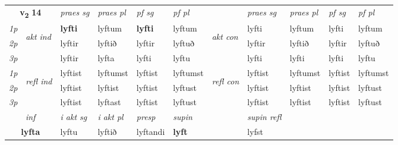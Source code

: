 \noindent
\begin{tabular}{lllllllllll} \toprule
\multicolumn{2}{c}{\textbf{v{\textsubscript{2}}} \Large{\textbf{14}}}  &  \textit{praes sg}  & \textit{praes pl}  &\textit{ pf sg} & \textit{pf pl} &  &  \textit{praes sg}  & \textit{praes pl}  & \textit{pf sg} & \textit{pf pl } \\*
	\cmidrule{3-6} \cmidrule{8-11}
 {\textit{1p}} & \multirow{3}{*}{\begin{turn}{90}\textit{akt ind}\end{turn}} & \textbf{lyfti} & lyftum & \textbf{lyfti} & lyftum & \multirow{3}{*}{\begin{turn}{90}\textit{akt con}\end{turn}} &lyfti & lyftum & lyfti & lyftum\\*
 {\textit{2p}} &  &  lyftir  & lyftið & lyftir & lyftuð & & lyftir & lyftið & lyftir & lyftuð \\*
{\textit{3p}} &  & lyftir & lyfta & lyfti & lyftu & & lyfti & lyfti& lyfti & lyftu \\*
\cmidrule{3-6} \cmidrule{8-11}
 {\textit{1p}} & \multirow{3}{*}{\begin{turn}{90}\textit{refl ind}\end{turn}}  & lyftist & lyftumst & lyftist & lyftumst & \multirow{3}{*}{\begin{turn}{90}\textit{refl con}\end{turn}}  &lyftist & lyftumst & lyftist & lyftumst \\*
 {\textit{2p}} &  & lyftist & lyftist & lyftist & lyftust & &lyftist & lyftist & lyftist & lyftust \\*
 {\textit{3p}}  & & lyftist & lyftast & lyftist & lyftust & & lyftist & lyftist& lyftist & lyftust \\*
\cmidrule{3-6} \cmidrule{8-11}

   \multicolumn{2}{c}{\textit{inf}}  & \textit{i akt sg} & \textit{i akt pl}   & \textit{presp} & \textit{supin} && \textit{supin refl}  \\*
  \multicolumn{2}{c}{\textbf{lyfta}} & lyftu  & lyftið   & lyftandi &  \textbf{lyft} && lyfst  \\*
\end{tabular}


